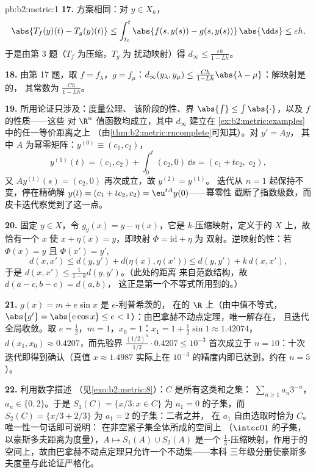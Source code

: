 \begin{solution}{pb:b2:metric:1}
\textbf{17.} 方案相同：对 $y \in X_h$，
\[
\abs{T_f(y)(t) - T_g(y)(t)} \leq \int_{t_0}^t \abs{f(s,y(s)) -
g(s,y(s))}\,\abs{\dd s} \leq \varepsilon h ,
\]
于是由第 3 题（$T_f$ 为压缩，$T_g$ 为
扰动映射）得 $d_\infty \leq \frac{\varepsilon h}{1 - Lh}$。

\textbf{18.} 由第 17 题，取 $f = f_\lambda$，$g =
f_\mu$：$d_\infty(y_\lambda, y_\mu) \leq \frac{Ch}{1 -
Lh}\abs{\lambda - \mu}$：解映射是的，
其常数为 $\frac{Ch}{1-Lh}$。

\textbf{19.} 所用论证只涉及：度量公理、
该阶段的性、界 $\abs{\int} \leq
\int\abs{\cdot}$，以及 $f$ 的性质——这些
对 $\R^n$ 值函数均成立，其中 $d_\infty$ 建立在
\cref{ex:b2:metric:examples}中的任一等价距离之上
（由\cref{thm:b2:metric:rncomplete}可知其）。对 $y' = Ay$，
其中 $A$ 为幂零矩阵：$y^{(0)} \equiv (c_1, c_2)$，
\[
y^{(1)}(t) = (c_1, c_2) + \int_0^t (c_2, 0)\,\dd s
= (c_1 + tc_2,\; c_2),
\]
又 $Ay^{(1)}(s) = (c_2, 0)$ 再次成立，故 $y^{(2)} = y^{(1)}$。
迭代从 $n = 1$ 起保持不变，停在精确解
$y(t) = (c_1 + tc_2, c_2) = \eu^{tA}y(0)$——幂零性
截断了指数级数，而皮卡迭代察觉到了这一点。

\textbf{20.} 固定 $y \in X$，令 $g_y(x) = y - \eta(x)$，它是
$k$-压缩映射，定义于的 $X$ 上，故恰有一个 $x$
使 $x + \eta(x) = y$，即映射 $\Phi = \mathrm{id} + \eta$ 为
双射。逆映射的性：若 $\Phi(x) = y$ 且 $\Phi(x') =
y'$,
\[
d(x, x') \leq d(y, y') + d\bigl(\eta(x), \eta(x')\bigr)
\leq d(y, y') + k\,d(x, x'),
\]
于是 $d(x, x') \leq \frac{1}{1-k}d(y, y')$。（此处的距离
来自范数结构，故 $d(a - c, b - c) = d(a, b)$，
这正是第一个不等式所用到的。）

\textbf{21.} $g(x) = m + e\sin x$ 是 $e$-利普希茨的，
在的 $\R$ 上（由中值不等式，$\abs{g'} = \abs{e\cos x}
\leq e < 1$）：由巴拿赫不动点定理，唯一解存在，
且迭代全局收敛。取 $e = \frac12$，$m = 1$，$x_0
= 1$：$x_1 = 1 + \frac12\sin 1 \approx 1.42074$，$d(x_1, x_0)
\approx 0.4207$，而先验界
$\frac{(1/2)^n}{1/2}\cdot 0.4207 \leq 10^{-3}$ 首次成立于
$n = 10$：十次迭代即得到确认（真值 $x \approx
1.4987$ 实际上在 $10^{-3}$ 的精度内即已达到，约在 $n =
5$）。

\textbf{22.} 利用数字描述
（见\cref{exo:b2:metric:8}）：$C$ 是所有这类和之集：
$\sum_{n\geq1}a_n3^{-n}$，$a_n \in \{0, 2\}$。于是 $S_1(C) =
\{x/3 : x \in C\}$ 为 $a_1 = 0$ 的子集，而 $S_2(C) =
\{x/3 + 2/3\}$ 为 $a_1 = 2$ 的子集：二者之并，
在 $a_1$ 自由选取时恰为 $C$。唯一性一句话即可说明：
在非空紧子集全体所成的空间上
（$\intcc01$ 的子集，以豪斯多夫距离为度量），$A \mapsto
S_1(A) \cup S_2(A)$ 是一个 $\frac13$-压缩映射，作用于的
空间上，故由巴拿赫不动点定理只允许一个不动集——本科
三年级分册使豪斯多夫度量与此论证严格化。


\end{solution}
